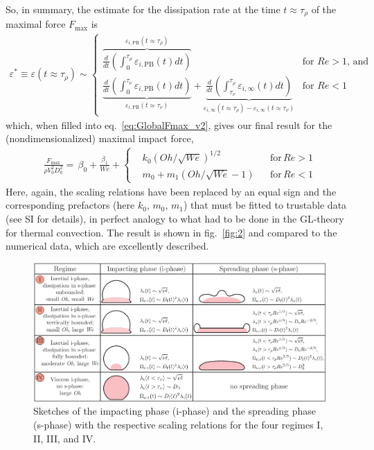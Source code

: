 \documentclass[preprint,amssymb,superscriptaddress,aps,prl,floatfix]{revtex4-1}
\begin{document}
So,  in summary, the estimate for the dissipation  rate at
the time $t \approx \tau_\rho$ 
of  the maximal force $F_\text{max}$ is 
\begin{align}\label{fmax} 
\varepsilon^* \equiv \varepsilon(t \approx \tau_\rho) \sim 
\begin{cases}
    \overbrace{\frac{d}{dt}\left(\int_0^{\tau_\rho}\varepsilon_{i,\text{PB}}(t) dt\right)}^{\varepsilon_{i,\text{PB}}(t \approx \tau_\rho)}
    & \text{for } Re > 1\text{, and} \\[4ex]
    \underbrace{\frac{d}{dt}\left(\int_0^{\tau_\nu}\varepsilon_{i,\text{PB}}(t) dt\right)}_{\varepsilon_{i,\text{PB}}(t \approx \tau_\nu)} + \underbrace{\frac{d}{dt}\left(\int_{\tau_\nu}^{\tau_\rho}\varepsilon_{i,\infty}(t) dt\right)}_{\varepsilon_{i,\infty}(t \approx \tau_\rho) - \varepsilon_{i,\infty}(t \approx \tau_\nu)}
    & \text{for } Re < 1
\end{cases}
\end{align}
which, when filled into  eq.\ \eqref{eq:GlobalFmax_v2}, gives our final
result for the (nondimensionalized) maximal impact force, 
\begin{align}
	\label{eq:FinalFmax}
	\frac{F_{\text{max}}}{\rho V_0^2D_0^2} =\, \beta_0 + \frac{\beta_1}{We} + \left\{ \begin{aligned} &k_0 \left(Oh/\sqrt{We}\right)^{1/2} && \text{for}\,Re > 1\\ &m_0 + m_1\left(Oh/\sqrt{We} - 1\right) && \text{for}\,Re < 1 \end{aligned} \right.
\end{align}
Here, again, the scaling relations have been replaced by an equal sign and the corresponding prefactors 
(here $k_0$, $m_0$, $m_1$) 
that 
must be fitted to trustable data (see SI for details), 
in perfect analogy to what had to be done
in the GL-theory for thermal convection. 
The result is shown in  fig.~\ref{fig:2} and compared to the 
numerical data, which are excellently described.

\begin{figure}
	\centering
	\includegraphics[width=\linewidth]{table1_v2-eps-converted-to.pdf}
	\caption{Sketches of the impacting phase (i-phase)
 and the spreading phase (s-phase) with the respective
 scaling relations for the four regimes I, II, III, and IV.  
 }
	\label{fig-table}
\end{figure}
\end{document}
